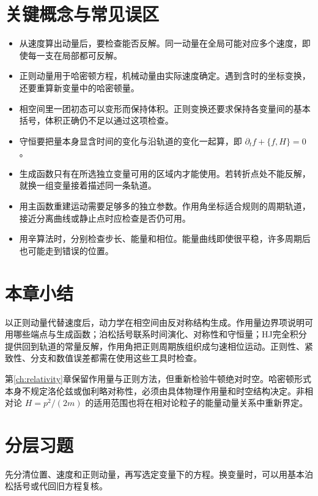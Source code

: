 \section*{关键概念与常见误区}
\begin{itemize}[leftmargin=1.8em]
\item 从速度算出动量后，要检查能否反解。同一动量在全局可能对应多个速度，即使每一支在局部都可反解。
\item 正则动量用于哈密顿方程，机械动量由实际速度确定。遇到含时的坐标变换，还要重算新变量中的哈密顿量。
\item 相空间里一团初态可以变形而保持体积。正则变换还要求保持各变量间的基本括号，体积正确仍不足以通过这项检查。
\item 守恒要把量本身显含时间的变化与沿轨道的变化一起算，即 $\partial_tf+\{f,H\}=0$。
\item 生成函数只有在所选独立变量可用的区域内才能使用。若转折点处不能反解，就换一组变量接着描述同一条轨道。
\item 用主函数重建运动需要足够多的独立参数。作用角坐标适合规则的周期轨道，接近分离曲线或静止点时应检查是否仍可用。
\item 用辛算法时，分别检查步长、能量和相位。能量曲线即使很平稳，许多周期后也可能走到错误的位置。
\end{itemize}

\section*{本章小结}
以正则动量代替速度后，动力学在相空间由反对称结构生成。作用量边界项说明可用哪些端点与生成函数；泊松括号联系时间演化、对称性和守恒量；HJ完全积分提供回到轨道的常量反解，作用角把正则周期族组织成匀速相位运动。正则性、紧致性、分支和数值误差都需在使用这些工具时检查。

第\ref{ch:relativity}章保留作用量与正则方法，但重新检验牛顿绝对时空。哈密顿形式本身不规定洛伦兹或伽利略对称性，必须由具体物理作用量和时空结构决定。非相对论 $H=p^2/(2m)$ 的适用范围也将在相对论粒子的能量动量关系中重新界定。

\section*{分层习题}
先分清位置、速度和正则动量，再写选定变量下的方程。换变量时，可以用基本泊松括号或代回旧方程复核。

